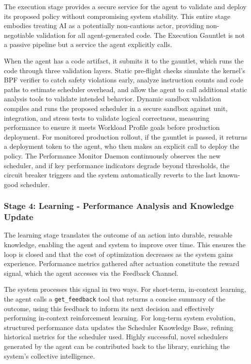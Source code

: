 The execution stage provides a secure service for the agent to validate and deploy its proposed policy without compromising system stability. This entire stage embodies treating AI as a potentially non-cautious actor, providing non-negotiable validation for all agent-generated code. The Execution Gauntlet is not a passive pipeline but a service the agent explicitly calls.

When the agent has a code artifact, it submits it to the gauntlet, which runs the code through three validation layers. Static pre-flight checks simulate the kernel's BPF verifier to catch safety violations early, analyze instruction counts and code paths to estimate scheduler overhead, and allow the agent to call additional static analysis tools to validate intended behavior. Dynamic sandbox validation compiles and runs the proposed scheduler in a secure sandbox against unit, integration, and stress tests to validate logical correctness, measuring performance to ensure it meets Workload Profile goals before production deployment. For monitored production rollout, if the gauntlet is passed, it returns a deployment token to the agent, who then makes an explicit call to deploy the policy. The Performance Monitor Daemon continuously observes the new scheduler, and if key performance indicators degrade beyond thresholds, the circuit breaker triggers and the system automatically reverts to the last known-good scheduler.

\subsubsection{Stage 4: Learning - Performance Analysis and Knowledge Update}

The learning stage translates the outcome of an action into durable, reusable knowledge, enabling the agent and system to improve over time. This ensures the loop is closed and that the cost of optimization decreases as the system gains experience. Performance metrics gathered after actuation constitute the reward signal, which the agent accesses via the Feedback Channel.

The system processes this signal in two ways. For short-term, in-context learning, the agent calls a \texttt{get\_feedback} tool that returns a concise summary of the outcome, using this feedback to inform its next decision and effectively performing in-context reinforcement learning. For long-term system evolution, structured performance data updates the Scheduler Knowledge Base, refining historical metrics for the scheduler used. Highly successful, novel schedulers generated by the agent can be contributed back to the library, enriching the system's collective intelligence.


